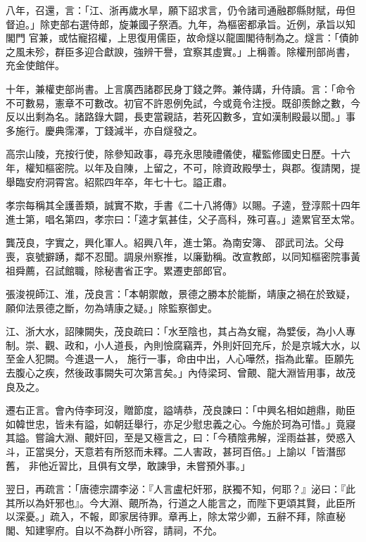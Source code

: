 \begin{pinyinscope}
 八年，召還，言：「江、浙再歲水旱，願下詔求言，仍令諸司通融郡縣財賦，毋但督迫。」除吏部右選侍郎，旋兼國子祭酒。九年，為樞密都承旨。近例，承旨以知閣門
 官兼，或怙寵招權，上思復用儒臣，故命燧以龍圖閣待制為之。燧言：「債帥之風未殄，群臣多迎合獻諛，強辨干譽，宜察其虛實。」上稱善。除權刑部尚書，充金使館伴。



 十年，兼權吏部尚書。上言廣西諸郡民身丁錢之弊。兼侍講，升侍讀。言：「命令不可數易，憲章不可數改。初官不許恩例免試，今或竟令注授。既卻羨餘之數，今反以出剩為名。諸路錄大闢，長吏當親詰，若死囚數多，宜如漢制殿最以聞。」事多施行。慶典霈澤，丁錢減半，亦自燧發之。



 高宗山陵，充按行使，除參知政事，尋充永思陵禮儀使，權監修國史日歷。十六年，權知樞密院。以年及自陳，上留之，不可，除資政殿學士，與郡。復請閑，提舉臨安府洞霄宮。紹熙四年卒，年七十七。謚正肅。



 孝宗每稱其全護善類，誠實不欺，手書《二十八將傳》以賜。子逵，登淳熙十四年進士第，唱名第四，孝宗曰：「逵才氣甚佳，父子高科，殊可喜。」逵累官至太常。



 龔茂良，字實之，興化軍人。紹興八年，進士第。為南安簿、
 邵武司法。父母喪，哀號擗踴，鄰不忍聞。調泉州察推，以廉勤稱。改宣教郎，以同知樞密院事黃祖舜薦，召試館職，除秘書省正字。累遷吏部郎官。



 張浚視師江、淮，茂良言：「本朝禦敵，景德之勝本於能斷，靖康之禍在於致疑，願仰法景德之斷，勿為靖康之疑。」除監察御史。



 江、浙大水，詔陳闕失，茂良疏曰：「水至陰也，其占為女寵，為嬖佞，為小人專制。崇、觀、政和，小人道長，內則憸腐竊弄，外則奸回充斥，於是京城大水，以至金人犯闕。今進退一人，
 施行一事，命由中出，人心嘩然，指為此輩。臣願先去腹心之疾，然後政事闕失可次第言矣。」內侍梁珂、曾覿、龍大淵皆用事，故茂良及之。



 遷右正言。會內侍李珂沒，贈節度，謚靖恭，茂良諫曰：「中興名相如趙鼎，勛臣如韓世忠，皆未有謚，如朝廷舉行，亦足少慰忠義之心。今施於珂為可惜。」竟寢其謚。嘗論大淵、覿奸回，至是又極言之，曰：「今積陰弗解，淫雨益甚，熒惑入斗，正當吳分，天意若有所怒而未釋。二人害政，甚珂百倍。」上諭以「皆潛邸舊，
 非他近習比，且俱有文學，敢諫爭，未嘗預外事。」



 翌日，再疏言：「唐德宗謂李泌：『人言盧杞奸邪，朕獨不知，何耶？』泌曰：『此其所以為奸邪也』。今大淵、覿所為，行道之人能言之，而陛下更頌其賢，此臣所以深憂。」疏入，不報，即家居待罪。章再上，除太常少卿，五辭不拜，除直秘閣、知建寧府。自以不為群小所容，請祠，不允。




\end{pinyinscope}
